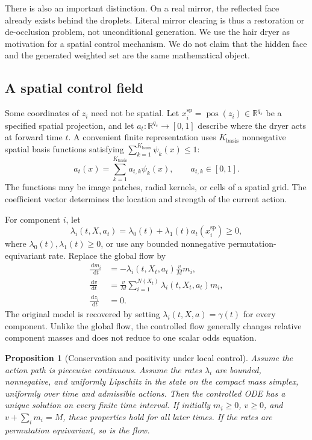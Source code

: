 \documentclass[10pt]{article}
\newtheorem{proposition}[theorem]{Proposition}
\theoremstyle{definition}
\theoremstyle{remark}
\newcommand{\R}{\mathbb{R}}
\newcommand{\dd}{\,\mathrm{d}}
\begin{document}
There is also an important distinction.  On a real mirror, the reflected
face already exists behind the droplets.  Literal mirror clearing is thus a
restoration or de-occlusion problem, not unconditional generation.  We use
the hair dryer as motivation for a spatial control mechanism.  We do not
claim that the hidden face and the generated weighted set are the same
mathematical object.

\subsection{A spatial control field}

Some coordinates of $z_i$ need not be spatial.  Let
$x_i^{\mathrm{sp}}=\operatorname{pos}(z_i)\in\R^{q_s}$ be a specified spatial projection,
and let $a_t:\R^{q_s}\to[0,1]$ describe where the dryer acts at forward
time $t$.
A convenient finite representation uses $K_{\mathrm{basis}}$ nonnegative
spatial basis functions satisfying
$\sum_{k=1}^{K_{\mathrm{basis}}}\psi_k(x)\leq1$:
\begin{equation}
  a_t(x)=\sum_{k=1}^{K_{\mathrm{basis}}}a_{t,k}\psi_k(x),
  \qquad a_{t,k}\in[0,1].
  \label{eq:local-control-basis}
\end{equation}
The functions may be image patches, radial kernels, or cells of a spatial
grid.  The coefficient vector determines the location and strength of the
current action.

For component $i$, let
\begin{equation}
  \lambda_i(t,X,a_t)
  =\lambda_0(t)+\lambda_1(t)a_t(x_i^{\mathrm{sp}})\geq0,
  \label{eq:local-evaporation-rate}
\end{equation}
where $\lambda_0(t),\lambda_1(t)\geq0$, or use any bounded nonnegative
permutation-equivariant rate.  Replace the
global flow by
\begin{align}
  \frac{\dd m_i}{\dd t}
  &=-\lambda_i(t,X_t,a_t)\frac{v}{M}m_i,
  \label{eq:controlled-flow-mi}\\
  \frac{\dd v}{\dd t}
  &=\frac{v}{M}\sum_{i=1}^{N(X_t)}
    \lambda_i(t,X_t,a_t)m_i,
  \label{eq:controlled-flow-v}\\
  \frac{\dd z_i}{\dd t}&=0.
\end{align}
The original model is recovered by setting
$\lambda_i(t,X,a)=\gamma(t)$ for every component.  Unlike the global flow,
the controlled flow generally changes relative component masses and does
not reduce to one scalar odds equation.

\begin{proposition}[Conservation and positivity under local control]
\label{prop:controlled-conservation}
Assume the action path is piecewise continuous.  Assume the rates
$\lambda_i$ are bounded, nonnegative, and uniformly Lipschitz in the state
on the compact mass simplex, uniformly over time and admissible actions.
Then the controlled ODE has a unique solution on every finite time interval.  If initially
$m_i\geq0$, $v\geq0$, and $v+\sum_i m_i=M$, these properties hold for all
later times.  If the rates are permutation equivariant, so is the flow.
\end{proposition}
\end{document}
